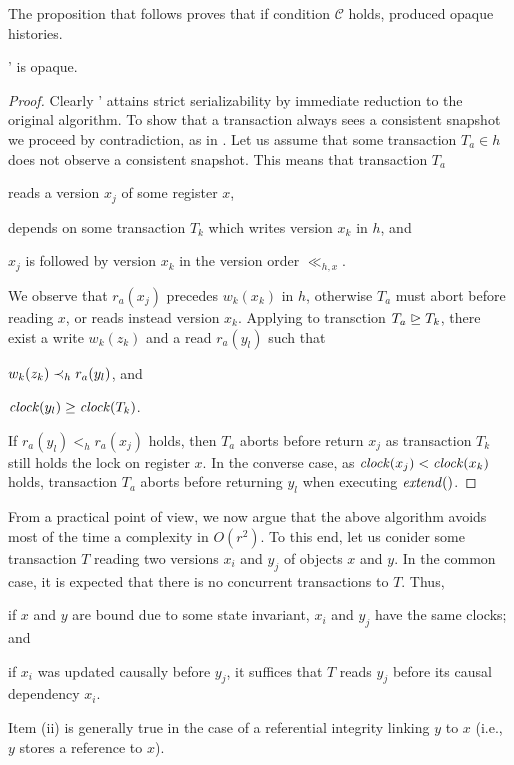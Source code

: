 The proposition that follows proves that if condition $\mathcal{C}$ holds,  produced opaque histories.

\begin{theorem}
  ' is opaque.
\end{theorem}

\begin{proof}

  Clearly ' attains strict serializability by immediate reduction to the original algorithm.
  To show that a transaction always sees a consistent snapshot we proceed by contradiction, as in .
  Let us assume that some transaction $T_a \in h$ does not observe a consistent snapshot.
  This means that transaction $T_a$
  \begin{inparaenum}
  \item reads a version $x_j$ of some register $x$,
  \item depends on some transaction $T_k$ which writes version $x_k$ in $h$, and
  \item $x_j$ is followed by version $x_k$ in the version order $\ll_{h,x}$.
  \end{inparaenum}
  We observe that $r_a(x_j)$ precedes $w_k(x_k)$ in $h$, otherwise $T_a$ must abort before reading $x$, or reads instead version $x_k$.
  Applying  to transction $T_a \mathrel{\unrhd} T_k$, there exist a write $w_k(z_k)$ and a read $r_a(y_l)$ such that
  \begin{inparaenum}
  \item $w_k(z_k) \hb_h r_a(y_l)$, and
  \item $\clockOf{y_l} \geq \clockOf{T_k}$.
  \end{inparaenum}  
  If $r_a(y_l) <_h r_a(x_j)$ holds, then $T_a$ aborts before return $x_j$ as transaction $T_k$ still holds the lock on register $x$.
  In the converse case, as $\clockOf{x_j} < \clockOf{x_k}$ holds, transaction $T_a$ aborts before returning $y_l$ when executing $\stmExtend{}$.  
    
\end{proof}

From a practical point of view, we now argue that the above algorithm avoids most of the time a complexity in $O(r^2)$.
To this end, let us conider some transaction $T$ reading two versions $x_i$ and $y_j$ of objects $x$ and $y$.
In the common case, it is expected that there is no concurrent transactions to $T$.
Thus,
\begin{inparaenum}
\item if $x$ and $y$ are bound due to some state invariant, $x_i$ and $y_j$ have the same clocks; and
\item if $x_i$ was updated causally before $y_j$, it suffices that $T$ reads $y_j$ before its causal dependency $x_i$.
\end{inparaenum}
Item (ii) is generally true in the case of a referential integrity linking $y$ to $x$ (i.e., $y$ stores a reference to $x$).



